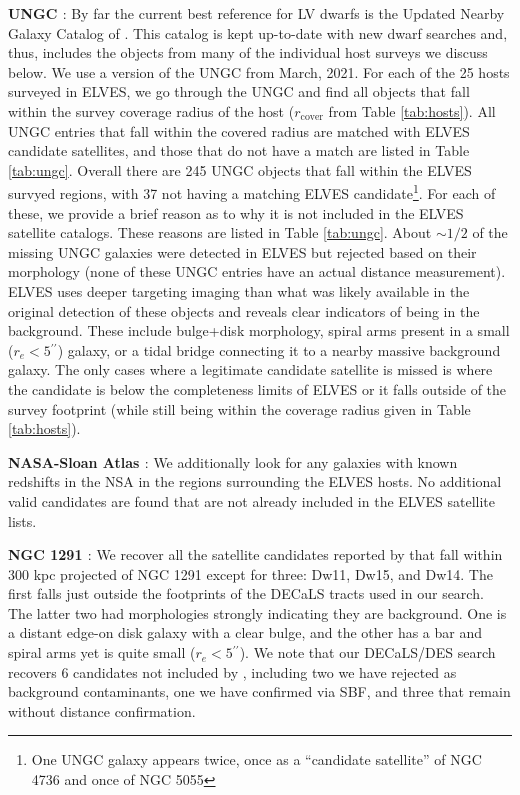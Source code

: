 \documentclass[twocolumn]{aastex62}
\newcommand{\arcs}{$^{\prime\prime}$} %
\begin{document}
\textbf{UNGC \citep{karachentsev2013}}: By far the current best reference for LV dwarfs is the Updated Nearby Galaxy Catalog of \citet{karachentsev2013}. This catalog is kept up-to-date with new dwarf searches and, thus, includes the objects from many of the individual host surveys we discuss below. We use a version of the UNGC from March, 2021. For each of the 25 hosts surveyed in ELVES, we go through the UNGC and find all objects that fall within the survey coverage radius of the host ($r_\mathrm{cover}$ from Table \ref{tab:hosts}). All UNGC entries that fall within the covered radius are matched with ELVES candidate satellites, and those that do not have a match are listed in Table \ref{tab:ungc}. Overall there are 245 UNGC objects that fall within the ELVES survyed regions, with 37 not having a matching ELVES candidate\footnote{One UNGC galaxy appears twice, once as a ``candidate satellite'' of NGC 4736 and once of NGC 5055}. For each of these, we provide a brief reason as to why it is not included in the ELVES satellite catalogs. These reasons are listed in Table \ref{tab:ungc}. About $\sim1/2$ of the missing UNGC galaxies were detected in ELVES but rejected based on their morphology (none of these UNGC entries have an actual distance measurement). ELVES uses deeper targeting imaging than what was likely available in the original detection of these objects and reveals clear indicators of being in the background. These include bulge+disk morphology, spiral arms present in a small ($r_e<5$\arcs) galaxy, or a tidal bridge connecting it to a nearby massive background galaxy. The only cases where a legitimate candidate satellite is missed is where the candidate is below the completeness limits of ELVES or it falls outside of the survey footprint (while still being within the coverage radius given in Table \ref{tab:hosts}). 


\textbf{NASA-Sloan Atlas \citep[NSA;][]{blanton2011}}: We additionally look for any galaxies with known redshifts in the NSA in the regions surrounding the ELVES hosts. No additional valid candidates are found that are not already included in the ELVES satellite lists.


\textbf{NGC 1291 \citep{byun2020}}: We recover all the satellite candidates reported by \citet{byun2020} that fall within 300 kpc projected of NGC 1291 except for three: Dw11, Dw15, and Dw14. The first falls just outside the footprints of the DECaLS tracts used in our search. The latter two had morphologies strongly indicating they are background. One is a distant edge-on disk galaxy with a clear bulge, and the other has a bar and spiral arms yet is quite small ($r_e<5$\arcs). We note that our DECaLS/DES search recovers 6 candidates not included by \citet{byun2020}, including two we have rejected as background contaminants, one we have confirmed via SBF, and three that remain without distance confirmation.
\end{document}
